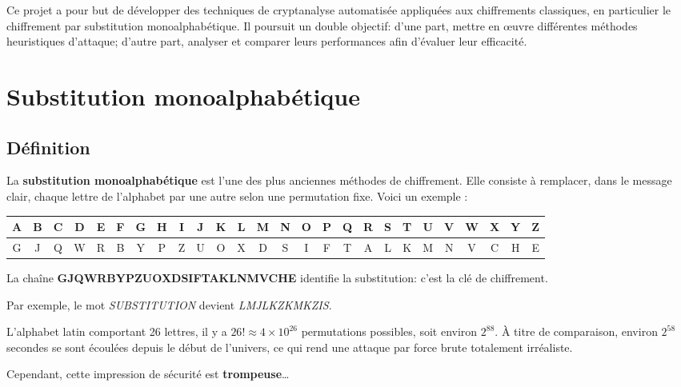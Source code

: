\documentclass[a4paper]{article}
\begin{document}
Ce projet a pour but de développer des techniques de cryptanalyse automatisée appliquées aux chiffrements classiques, en particulier le chiffrement par substitution monoalphabétique. Il poursuit un double objectif: d’une part, mettre en œuvre différentes méthodes heuristiques d’attaque; d’autre part, analyser et comparer leurs performances afin d’évaluer leur efficacité.

\section{Substitution monoalphabétique}

\subsection{Définition}

La \textbf{substitution monoalphabétique} est l’une des plus anciennes méthodes de chiffrement. Elle consiste à remplacer, dans le message clair, chaque lettre de l’alphabet par une autre selon une permutation fixe. Voici un exemple :

\vspace{1em}
    \begin{adjustbox}{width=\textwidth,center}
        \begin{tabular}{|c|c|c|c|c|c|c|c|c|c|c|c|c|c|c|c|c|c|c|c|c|c|c|c|c|c|}
        \hline
        A & B & C & D & E & F & G & H & I & J & K & L & M & N & O & P & Q & R & S & T & U & V & W & X & Y & Z \\
        \hline
        G & J & Q & W & R & B & Y & P & Z & U & O & X & D & S & I & F & T & A & L & K & M & N & V & C & H & E \\
        \hline
        \end{tabular}
    \end{adjustbox}
\vspace{1em}

La chaîne \textbf{GJQWRBYPZUOXDSIFTAKLNMVCHE} identifie la substitution: c'est la clé de chiffrement.

Par exemple, le mot \textit{SUBSTITUTION} devient  \textit{LMJLKZKMKZIS}.

L’alphabet latin comportant 26 lettres, il y a $26! \approx 4 \times 10^{26}$ permutations possibles, soit environ $2^{88}$. À titre de comparaison, environ $2^{58}$ secondes se sont écoulées depuis le début de l’univers, ce qui rend une attaque par force brute totalement irréaliste.

Cependant, cette impression de sécurité est \textbf{trompeuse}\ldots
\end{document}
